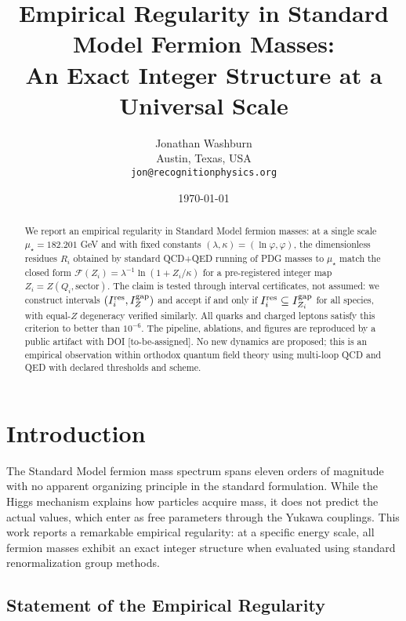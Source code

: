\documentclass[11pt]{article}
\title{Empirical Regularity in Standard Model Fermion Masses:\\
An Exact Integer Structure at a Universal Scale}
\author{Jonathan Washburn\\
Austin, Texas, USA\\
\texttt{jon@recognitionphysics.org}}
\date{\today}
\begin{document}
\maketitle

\begin{abstract}
We report an empirical regularity in Standard Model fermion masses: at a single scale $\mu_\star = 182.201$ GeV and with fixed constants $(\lambda,\kappa) = (\ln\varphi, \varphi)$, the dimensionless residues $R_i$ obtained by standard QCD+QED running of PDG masses to $\mu_\star$ match the closed form $\mathcal{F}(Z_i) = \lambda^{-1}\ln(1+Z_i/\kappa)$ for a pre-registered integer map $Z_i = Z(Q_i,\text{sector})$. The claim is tested through interval certificates, not assumed: we construct intervals $(I^{\rm res}_i, I^{\rm gap}_{Z})$ and accept if and only if $I^{\rm res}_i \subseteq I^{\rm gap}_{Z_i}$ for all species, with equal-$Z$ degeneracy verified similarly. All quarks and charged leptons satisfy this criterion to better than $10^{-6}$. The pipeline, ablations, and figures are reproduced by a public artifact with DOI [to-be-assigned]. No new dynamics are proposed; this is an empirical observation within orthodox quantum field theory using multi-loop QCD and QED with declared thresholds and scheme.
\end{abstract}

\section{Introduction}

The Standard Model fermion mass spectrum spans eleven orders of magnitude with no apparent organizing principle in the standard formulation. While the Higgs mechanism explains how particles acquire mass, it does not predict the actual values, which enter as free parameters through the Yukawa couplings. This work reports a remarkable empirical regularity: at a specific energy scale, all fermion masses exhibit an exact integer structure when evaluated using standard renormalization group methods.

\subsection{Statement of the Empirical Regularity}
\end{document}
